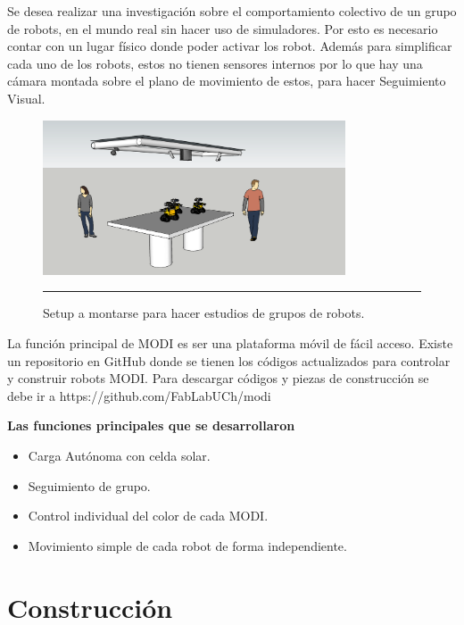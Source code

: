Se desea realizar una investigación sobre el comportamiento colectivo de un grupo de robots, en el mundo real sin hacer uso de simuladores. Por esto  es necesario contar con un lugar físico donde poder activar los robot. Además para simplificar cada uno de los robots, estos no tienen sensores internos por lo que hay una cámara montada sobre el plano de movimiento de estos, para hacer Seguimiento Visual.
\begin{figure}[htbp]
	\centering
		\includegraphics[width=0.8\textwidth]{./Figures/setup.png}
		\rule{35em}{0.5pt}
	\caption[Setup]{Setup a montarse para hacer estudios de grupos de robots.}
	\label{fig:setup}
\end{figure}

La función principal de MODI es ser una plataforma móvil de fácil acceso. Existe un repositorio en GitHub donde se tienen los códigos actualizados para controlar y construir robots MODI.  Para descargar códigos y piezas de construcción se debe ir a https://github.com/FabLabUCh/modi

\textbf{Las funciones principales que se desarrollaron}

\begin{itemize}
\item Carga Autónoma con celda solar.
\item Seguimiento de grupo.
\item Control individual del color de cada MODI.
\item Movimiento simple de cada robot de forma independiente.
\end{itemize}



\section{Construcción}

